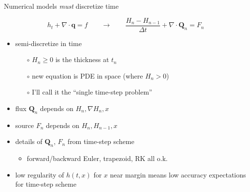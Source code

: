 \documentclass{beamer}
\newcommand\bq{\mathbf{q}}
\newcommand\bQ{\mathbf{Q}}
\newcommand{\Div}{\nabla\cdot}
\newcommand{\grad}{\nabla}
\begin{document}
\begin{frame}{Numerical models \emph{must} discretize time}

$$h_t + \Div\bq = f \qquad \to \qquad \frac{H_n - H_{n-1}}{\Delta t} + \Div \bQ_n = F_n$$

  \begin{itemize}
  \item semi-discretize in time
    \begin{itemize}
    \item[$\circ$] $H_n\ge 0$ is the thickness at $t_n$
    \item[$\circ$] new equation is PDE in space (where $H_n>0$)
    \item[$\circ$] I'll call it the ``single time-step problem''
    \end{itemize}
  \item flux $\bQ_n$ depends on $H_n,\grad H_n,x$
  \item source $F_n$ depends on $H_n,H_{n-1},x$
  \item<2-> details of $\bQ_n$, $F_n$ from time-step scheme
    \begin{itemize}
    \item<2->[$\circ$] forward/backward Euler, trapezoid, RK all o.k.
    \end{itemize}
  \item<3> low regularity of $h(t,x)$ for $x$ near margin means low accuracy expectations for time-step scheme
  \end{itemize}
\end{frame}
\end{document}
